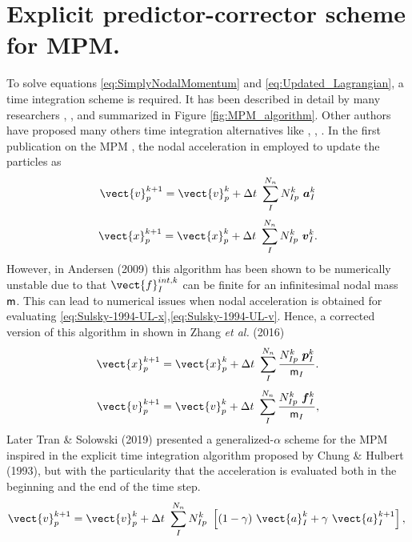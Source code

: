 \section{Explicit predictor-corrector scheme for MPM.}
\label{sec:epc-algor-mpm}

To solve equations \eqref{eq:SimplyNodalMomentum} and
\eqref{eq:Updated_Lagrangian}, a time integration scheme is
required. It has been described in detail by many researchers
\cite{Sulsky1994}, \cite{Bardenhagen2002}, \cite{thesis_Andersen_2009} and summarized
in Figure \ref{fig:MPM_algorithm}. Other authors have proposed many
others time integration alternatives like
\cite{Guilkey2003}, \cite{Tran2019e}, \cite{Charlton2017}. In the first publication on
the MPM \cite{Sulsky1994}, the nodal acceleration in employed to
update the particles as
\begin{equation}
  \label{eq:Sulsky-1994-UL-v}
  \vect{v}_p^{k+1} = \vect{v}_p^{k} + \Delta t\
  \sum^{N_n}_{I}N_{Ip}^{k}\ \vec{a}_{I}^{k}
\end{equation}
\begin{equation}
  \label{eq:Sulsky-1994-UL-x}
  \vect{x}_p^{k+1} = \vect{x}_p^{k} + \Delta t\ \sum^{N_n}_{I}N_{Ip}^{k}\ \vec{v}_{I}^{k}.
\end{equation}
However, in Andersen (2009)\cite{thesis_Andersen_2009} this
algorithm has been shown to be numerically unstable due to that
$\vect{f}_I^{int,k}$ can be finite for an infinitesimal nodal mass
$\mathsf{m}$. This can lead to numerical issues when nodal acceleration
is obtained for evaluating \eqref{eq:Sulsky-1994-UL-x},\eqref{eq:Sulsky-1994-UL-v}. Hence, a
corrected version of this algorithm in shown in Zhang {\it et al.}
(2016)\cite{Zhang_book_2016}
\begin{equation}
  \label{eq:Zhang-2016-UL-x}
  \vect{x}_p^{k+1} = \vect{x}_p^{k} + \Delta t\ \sum^{N_n}_{I} \frac{N_{Ip}^{k}\ \vec{p}_{I}^{k}}{\tens{m}_I}.  
\end{equation}
\begin{equation}
  \label{eq:Zhang-2016-UL-v}
  \vect{v}_p^{k+1} = \vect{v}_p^{k} + \Delta t\
  \sum^{N_n}_{I}\frac{N_{Ip}^{k}\ \vec{f}_{I}^{k}}{\tens{m}_I},
\end{equation}
Later Tran \& Solowski (2019)\cite{Tran2019e} presented a
generalized-$\alpha$ scheme for the MPM inspired in the explicit time
integration algorithm proposed by Chung \& Hulbert
(1993)\cite{Geranlized_alpha_1993}, but with the particularity that
the acceleration is evaluated both in the beginning and the end of the
time step.
\begin{equation}
  \label{eq:Tran-2019-GA-v}
  \vect{v}_p^{k+1} = \vect{v}_p^{k} + \Delta t\
  \sum^{N_n}_{I} N_{Ip}^{k}\ \left[(1 - \gamma)\ \vect{a}_I^{k} +
    \gamma\ \vect{a}_I^{k+1} \right],\\
\end{equation}
